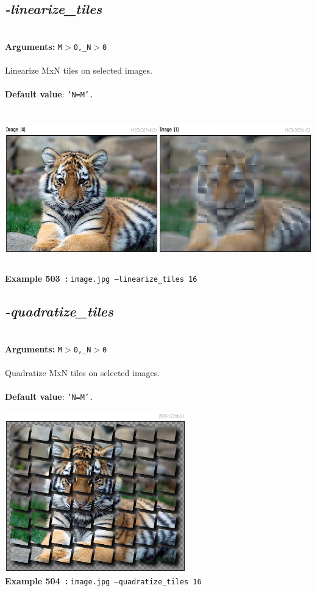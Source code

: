 \documentclass[a4paper,11pt,twoside]{book}
\begin{document}
\subsection{\emph{-linearize\_tiles} }\vspace*{-0.5em}
~\\\textbf{Arguments: } 
{\small \texttt{M$>$0,\_N$>$0}}\\~\\
Linearize MxN tiles on selected images.
~\\~\\\textbf{Default value}: {\small \texttt{'N=M'.}}
\begin{center}\includegraphics[keepaspectratio=true,height=7cm,width=\textwidth]{img/gmic_def503.jpg}\\
{\footnotesize \textbf{Example 503~:} \texttt{image.jpg --linearize\_tiles 16}}
\end{center}

\subsection{\emph{-quadratize\_tiles} }\vspace*{-0.5em}
~\\\textbf{Arguments: } 
{\small \texttt{M$>$0,\_N$>$0}}\\~\\
Quadratize MxN tiles on selected images.
~\\~\\\textbf{Default value}: {\small \texttt{'N=M'.}}
\begin{center}\includegraphics[keepaspectratio=true,height=7cm,width=\textwidth]{img/gmic_def504.jpg}\\
{\footnotesize \textbf{Example 504~:} \texttt{image.jpg --quadratize\_tiles 16}}
\end{center}
\end{document}
